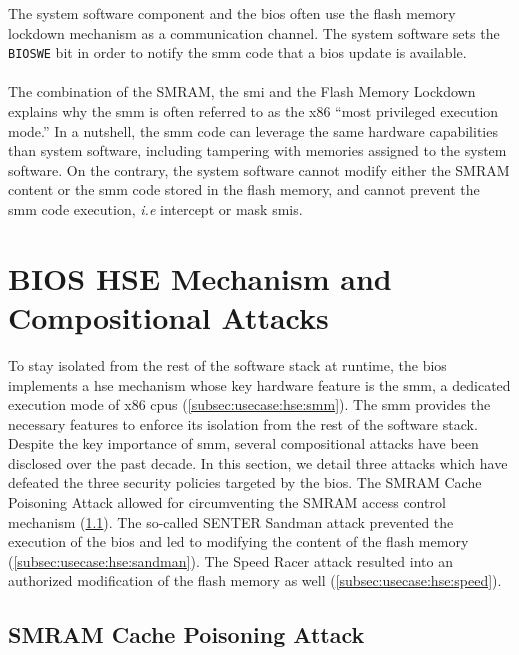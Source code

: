 The system software component and the \ac{bios} often use the flash memory
lockdown mechanism as a communication channel.
%
The system software sets the \texttt{BIOSWE} bit in order to notify the \ac{smm}
code that a \ac{bios} update is available.

\paragraph{}
%
The combination of the SMRAM, the \ac{smi} and the Flash Memory Lockdown
explains why the \ac{smm} is often referred to as the x86 ``most privileged
execution mode.''
%
In a nutshell, the \ac{smm} code can leverage the same hardware capabilities
than system software, including tampering with memories assigned to the system
software.
%
On the contrary, the system software cannot modify either the SMRAM content or
the \ac{smm} code stored in the flash memory, and cannot prevent the \ac{smm}
code execution, \emph{i.e} intercept or mask \acp{smi}.



\section{BIOS HSE Mechanism and Compositional Attacks}
\label{sec:usecase:hse}

To stay isolated from the rest of the software stack at runtime, the \ac{bios}
implements a \ac{hse} mechanism whose key hardware feature is the \ac{smm}, a
dedicated execution mode of x86 \acp{cpu} (\ref{subsec:usecase:hse:smm}).
%
The \ac{smm} provides the necessary features to enforce its isolation from the
rest of the software stack.
%
Despite the key importance of \ac{smm}, several compositional attacks have been
disclosed over the past decade.
%
In this section, we detail three attacks which have defeated the three security
policies targeted by the \ac{bios}.
%
The SMRAM Cache Poisoning Attack allowed for circumventing the SMRAM access
control mechanism (\ref{subsec:usecase:hse:smram}).
%
The so-called SENTER Sandman attack prevented the execution of the \ac{bios} and
led to modifying the content of the flash memory
(\ref{subsec:usecase:hse:sandman}).
%
The Speed Racer attack resulted into an authorized modification of the flash
memory as well (\ref{subsec:usecase:hse:speed}).

\subsection{SMRAM Cache Poisoning Attack} %
\label{subsec:usecase:hse:smram}

